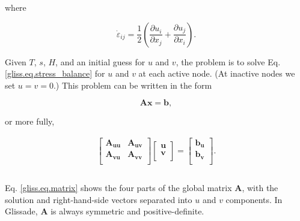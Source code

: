 \noindent
where

\begin{equation}
  \dot{\varepsilon }_{ij} = \frac{1}{2}\left( \frac{\partial u_{i}}{\partial x_{j}} + \frac{\partial u_{j}}{\partial x_{i}} \right).
\end{equation}

\noindent

Given $T$, $s$, $H$, and an initial guess for $u$ and $v$, the problem is to solve Eq. \eqref{gliss.eq.stress_balance}
for $u$ and $v$ at each active node.  (At inactive nodes we set $u=v=0$.)  This problem can be written in the form

\begin{equation}
  \label{gliss.eq.matrix_full}
  \mathbf{A} \mathbf{x} = \mathbf{b},
\end{equation}

\noindent
or more fully,

\begin{equation}
  \label{gliss.eq.matrix}
  \begin{matrix}
    \left[ \begin{matrix}
        \mathbf{A}_{\mathbf{uu}} & \mathbf{A}_{\mathbf{uv}}  \\
        \mathbf{A}_{\mathbf{vu}} & \mathbf{A}_{\mathbf{vv}}  \\
      \end{matrix} \right]\left[ \begin{matrix}
        \mathbf{u}  \\
        \mathbf{v}  \\
      \end{matrix} \right]=\left[ \begin{matrix}
        \mathbf{b}_{\mathbf{u}}  \\
        \mathbf{b}_{\mathbf{v}}  \\
      \end{matrix} \right]. \\ 
    \\ 
  \end{matrix}
\end{equation}

\noindent
Eq. \eqref{gliss.eq.matrix} shows the four parts of the global matrix $\mathbf{A}$,
with the solution and right-hand-side vectors separated into $u$ and $v$ components.
In Glissade, $\mathbf{A}$ is always symmetric and positive-definite.

